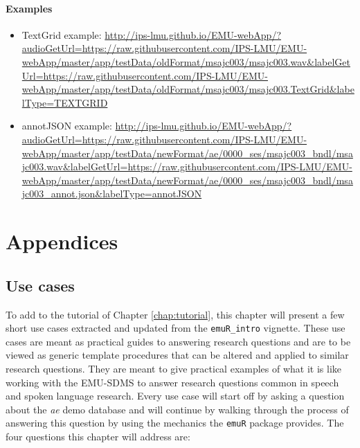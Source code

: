 \documentclass[]{book}
\providecommand{\tightlist}{%
  \setlength{\itemsep}{0pt}\setlength{\parskip}{0pt}}
\begin{document}
\hypertarget{examples-1}{%
\subsection{Examples}\label{examples-1}}

\begin{itemize}
\tightlist
\item
  TextGrid example: \url{http://ips-lmu.github.io/EMU-webApp/?audioGetUrl=https://raw.githubusercontent.com/IPS-LMU/EMU-webApp/master/app/testData/oldFormat/msajc003/msajc003.wav\&labelGetUrl=https://raw.githubusercontent.com/IPS-LMU/EMU-webApp/master/app/testData/oldFormat/msajc003/msajc003.TextGrid\&labelType=TEXTGRID}
\item
  annotJSON example: \url{http://ips-lmu.github.io/EMU-webApp/?audioGetUrl=https://raw.githubusercontent.com/IPS-LMU/EMU-webApp/master/app/testData/newFormat/ae/0000_ses/msajc003_bndl/msajc003.wav\&labelGetUrl=https://raw.githubusercontent.com/IPS-LMU/EMU-webApp/master/app/testData/newFormat/ae/0000_ses/msajc003_bndl/msajc003_annot.json\&labelType=annotJSON}
\end{itemize}

\hypertarget{part-appendices}{%
\part{Appendices}\label{part-appendices}}

\hypertarget{app-chap:useCases}{%
\chapter{Use cases}\label{app-chap:useCases}}

To add to the tutorial of Chapter \ref{chap:tutorial}, this chapter will present a few short use cases extracted and updated from the \texttt{emuR\_intro} vignette. These use cases are meant as practical guides to answering research questions and are to be viewed as generic template procedures that can be altered and applied to similar research questions. They are meant to give practical examples of what it is like working with the EMU-SDMS to answer research questions common in speech and spoken language research. Every use case will start off by asking a question about the \emph{ae} demo database and will continue by walking through the process of answering this question by using the mechanics the \texttt{emuR} package provides. The four questions this chapter will address are:
\end{document}
